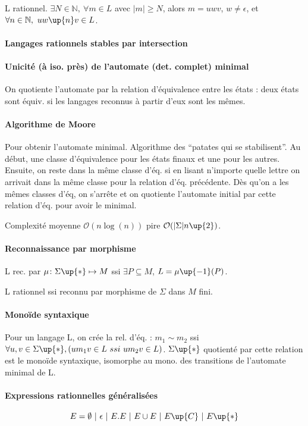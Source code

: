 \documentclass[french]{article}
\begin{document}
L rationnel. $\exists N\in\mathbb{N},\ \forall m\in L$ avec $|m|\geq N$, alors $m = uwv$, $w\neq\epsilon$, et $\forall n\in\mathbb{N},\ uw\up{n}v\in L$.

\paragraph{Langages rationnels stables par intersection}

\paragraph{Unicité (à iso. près) de l'automate (det. complet) minimal}
On quotiente l'automate par la relation d'équivalence entre les états : deux états sont équiv. si les langages reconnus à partir d'eux sont les mêmes.

\paragraph{Algorithme de Moore}
Pour obtenir l'automate minimal. Algorithme des ``patates qui se stabilisent''. Au début, une classe d'équivalence pour les états finaux et une pour les autres. Ensuite, on reste dans la même classe d'éq. si en lisant n'importe quelle lettre on arrivait dans la même classe pour la relation d'éq. précédente. Dès qu'on a les mêmes classes d'éq, on s'arrête et on quotiente l'automate initial par cette relation d'éq. pour avoir le minimal.

Complexité moyenne $\mathcal{O}(n\log(n))$ pire $\mathcal{O}(|\Sigma|n\up{2})$.

\paragraph{Reconnaissance par morphisme}
L rec. par $\mu\colon\Sigma\up{*}\mapsto M$ ssi $\exists P\subseteq M$, $L=\mu\up{-1}(P)$.

L rationnel ssi reconnu par morphisme de $\Sigma$ dans $M$ fini.

\paragraph{Monoïde syntaxique} 
Pour un langage L, on crée la rel. d'éq. : $m_1 \sim m_2$ ssi $\forall u,v \in\Sigma\up{*}, (um_1v\in L\ ssi\ um_2v\in L)$. $\Sigma\up{*}$ quotienté par cette relation est le monoïde syntaxique, isomorphe au mono. des transitions de l'automate minimal de L.

\paragraph{Expressions rationnelles généralisées}
$$E = \emptyset~|~\epsilon~|~E.E~|~E\cup E~|~E\up{C}~|~E\up{*}$$
\end{document}
